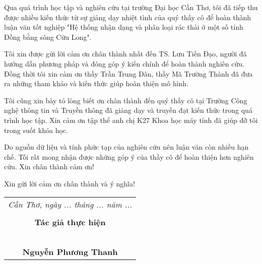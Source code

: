 \documentclass[./thesis.tex]{subfiles}
\begin{document}
{\fontsize{13}{12} \selectfont
Qua quá trình học tập và nghiên cứu tại trường Đại học Cần Thơ, tôi đã tiếp thu được nhiều kiến thức từ sự giảng dạy nhiệt tình của quý thầy cô để hoàn thành luận văn tốt nghiệp "Hệ thống nhận dạng và phân loại rác thải ở một số tỉnh Đồng bằng sông Cửu Long". 

}
\bigskip

{\fontsize{13}{12} \selectfont
Tôi xin được gửi lời cảm ơn chân thành nhất đến TS. Lưu Tiến Đạo, người đã hướng dẫn phương pháp và đóng góp ý kiến chính để hoàn thành nghiên cứu.
Đồng thời tôi xin cảm ơn thầy Trần Trung Dân, thầy Mã Trường Thành đã đưa ra những tham khảo và kiến thức giúp hoàn thiện mô hình.

}
\bigskip

{\fontsize{13}{12} \selectfont
Tôi cũng xin bày tỏ lòng biết ơn chân thành đến quý thầy cô tại Trường Công nghệ thông tin và Truyền thông đã giảng dạy và truyền đạt kiến thức trong quá trình học tập. Xin cảm ơn tập thể anh chị K27 Khoa học máy tính đã giúp đỡ tôi trong suốt khóa học.

}

\bigskip

{\fontsize{13}{12} \selectfont
Do nguồn dữ liệu và tính phức tạp của nghiên cứu nên luận văn còn nhiều hạn chế. Tối rất mong nhận được những góp ý của thầy cô để hoàn thiện hơn nghiên cứu.
Xin chân thành cảm ơn!

}

\bigskip

{\fontsize{13}{12} \selectfont
Xin gửi lời cảm ơn chân thành và ý nghĩa!

}

{\fontsize{13}{12} \selectfont
\hspace*{\fill}
\begin{tabular}{@{}c@{}} 

\\ \textit{Cần Thơ, ngày ... tháng ... năm ... } \\ \\
\textbf{Tác giả thực hiện}\\ \\
\\
\\
\\
\\
\textbf{Nguyễn Phương Thanh}
\end{tabular}

}
\end{document}
